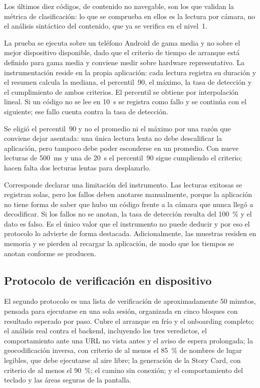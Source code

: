 Los últimos diez códigos, de contenido no navegable, son los que validan la métrica de
clasificación: lo que se comprueba en ellos es la lectura por cámara, no el análisis
sintáctico del contenido, que ya se verifica en el nivel~1.

La prueba se ejecuta sobre un teléfono Android de gama media y no sobre el mejor
dispositivo disponible, dado que el criterio de tiempo de arranque está definido para
gama media y conviene medir sobre hardware representativo. La instrumentación reside en
la propia aplicación: cada lectura registra su duración y el resumen calcula la mediana,
el percentil~90, el máximo, la tasa de detección y el cumplimiento de ambos criterios.
El percentil se obtiene por interpolación lineal. Si un código no se lee en 10~s se
registra como fallo y se continúa con el siguiente; ese fallo cuenta contra la tasa de
detección.

Se eligió el percentil~90 y no el promedio ni el máximo por una razón que conviene
dejar asentada: una única lectura lenta no debe descalificar la aplicación, pero
tampoco debe poder esconderse en un promedio. Con nueve lecturas de 500~ms y una de
20~s el percentil~90 sigue cumpliendo el criterio; hacen falta dos lecturas lentas para
desplazarlo.

Corresponde declarar una limitación del instrumento. Las lecturas exitosas se
registran solas, pero los fallos deben anotarse manualmente, porque la aplicación no
tiene forma de saber que hubo un código frente a la cámara que nunca llegó a
decodificar. Si los fallos no se anotan, la tasa de detección resulta del 100~\% y el
dato es falso. Es el único valor que el instrumento no puede deducir y por eso el
protocolo lo advierte de forma destacada. Adicionalmente, las muestras residen en
memoria y se pierden al recargar la aplicación, de modo que los tiempos se anotan
conforme se producen.

\subsection{Protocolo de verificación en dispositivo}

El segundo protocolo es una lista de verificación de aproximadamente 50 minutos,
pensada para ejecutarse en una sola sesión, organizada en cinco bloques con resultado
esperado por paso. Cubre el arranque en frío y el onboarding completo; el análisis real
contra el backend, incluyendo los tres veredictos, el comportamiento ante una URL no
vista antes y el aviso de espera prolongada; la geocodificación inversa, con criterio
de al menos el 85~\% de nombres de lugar legibles, que debe ejecutarse al aire libre;
la generación de la Story Card, con criterio de al menos el 90~\%; el camino sin
conexión; y el comportamiento del teclado y las áreas seguras de la pantalla.

